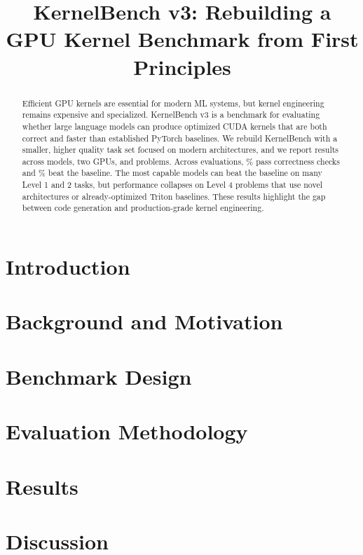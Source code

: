 \documentclass{article}
\title{KernelBench v3: Rebuilding a GPU Kernel Benchmark from First Principles}
\begin{document}
\maketitle

\begin{abstract}
Efficient GPU kernels are essential for modern ML systems, but kernel engineering remains expensive and specialized. KernelBench v3 is a benchmark for evaluating whether large language models can produce optimized CUDA kernels that are both correct and faster than established PyTorch baselines. We rebuild KernelBench with a smaller, higher quality task set focused on modern architectures, and we report results across \TotalModels{} models, two GPUs, and \TotalProblems{} problems. Across \TotalEvals{} evaluations, \OverallPassRate\% pass correctness checks and \OverallBeatRate\% beat the baseline. The most capable models can beat the baseline on many Level 1 and 2 tasks, but performance collapses on Level 4 problems that use novel architectures or already-optimized Triton baselines. These results highlight the gap between code generation and production-grade kernel engineering.
\end{abstract}

\section{Introduction}


\section{Background and Motivation}


\section{Benchmark Design}


\section{Evaluation Methodology}


\section{Results}


\section{Discussion}

\end{document}
